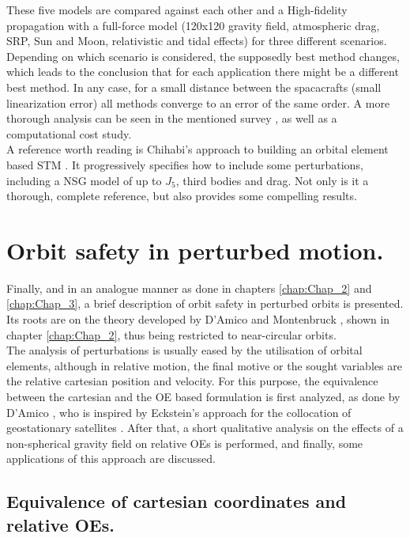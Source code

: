 %
\indent These five models are compared against each other and a High-fidelity propagation with a full-force model (120x120 gravity field, atmospheric drag, SRP, Sun and Moon, relativistic and tidal effects) for three different scenarios. Depending on which scenario is considered, the supposedly best method changes, which leads to the conclusion that for each application there might be a different best method. In any case, for a small distance between the spacacrafts (\ie small linearization error) all methods converge to an error of the same order. A more thorough analysis can be seen in the mentioned survey \cite{Sullivan}, as well as a computational cost study.\\
%
\indent A reference worth reading is Chihabi's approach to building an orbital element based STM \cite{Chihabi}. It progressively specifies how to include some perturbations, including a NSG model of up to $J_5$, third bodies and drag. Not only is it a thorough, complete reference, but also provides some compelling results.
%
\section{Orbit safety in perturbed motion.}\label{secCh5:EI}
%
\indent Finally, and in an analogue manner as done in chapters \ref{chap:Chap_2} and \ref{chap:Chap_3}, a brief description of orbit safety in perturbed orbits is presented. Its roots are on the theory developed by D'Amico and Montenbruck \cite{DAmico_Montenbruck}, shown in chapter \ref{chap:Chap_2}, thus being restricted to near-circular orbits. \\
%
\indent The analysis of perturbations is usually eased by the utilisation of orbital elements, although in relative motion, the final motive or the sought variables are the relative cartesian position and velocity. For this purpose, the equivalence between the cartesian and the OE based formulation is first analyzed, as done by D'Amico \cite{dAmicoDLR}, who is inspired by Eckstein's approach for the collocation of geostationary satellites \cite{Eckstein}. After that, a short qualitative analysis on the effects of a non-spherical gravity field on relative OEs is performed, and finally, some applications of this approach are discussed.
%
	\subsection{Equivalence of cartesian coordinates and relative OEs.}
